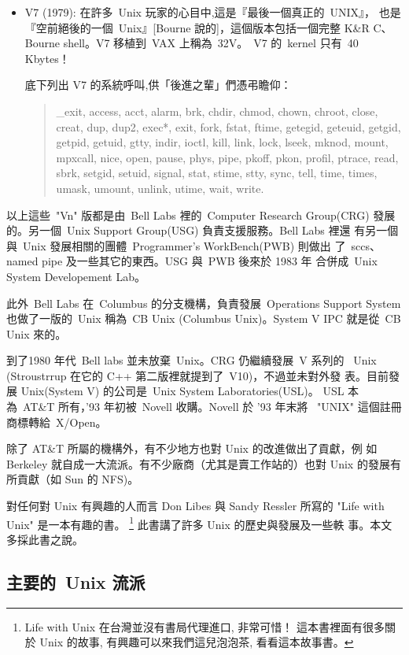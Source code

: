 \documentclass{article}
\begin{document}
\begin{CJK*}{Bg5}{ming}
{\begin{itemize}
    \item V7 (1979):  在許多~Unix 玩家的心目中,這是『最後一個真正的~UNIX』，
        也是『空前絕後的一個~Unix』[Bourne 說的]，這個版本包括一個完整
        K\&R C、Bourne shell。V7 移植到~VAX 上稱為~32V。~V7 的~kernel 
        只有~40 Kbytes！
    
    底下列出 V7 的系統呼叫,供「後進之輩」們憑弔瞻仰：
	\begin{quote}
        \_exit, access, acct, alarm, brk, chdir, chmod, chown,
        chroot, close, creat, dup, dup2, exec*, exit, fork, fstat,
        ftime, getegid, geteuid, getgid, getpid, getuid, gtty,
        indir, ioctl, kill, link, lock, lseek, mknod, mount,
        mpxcall, nice, open, pause, phys, pipe, pkoff, pkon,
        profil, ptrace, read, sbrk, setgid, setuid, signal, stat,
        stime, stty, sync, tell, time, times, umask, umount,
        unlink, utime, wait, write.
	\end{quote}
\end{itemize}
    以上這些~"Vn" 版都是由~Bell Labs 裡的~Computer Research Group(CRG) 
    發展的。另一個~Unix Support Group(USG) 負責支援服務。Bell Labs 裡還
    有另一個與~Unix 發展相關的團體~Programmer's WorkBench(PWB) 則做出
    了~sccs、named pipe 及一些其它的東西。USG 與~PWB 後來於 1983 年
    合併成~Unix System Developement Lab。

    此外~Bell Labs 在~Columbus 的分支機構，負責發展~Operations Support 
    System 也做了一版的~Unix 稱為~CB Unix (Columbus Unix)。System V IPC 
    就是從~CB Unix 來的。

    到了1980 年代~Bell labs 並未放棄~Unix。CRG 仍繼續發展~V 系列的
    ~Unix (Stroustrrup 在它的 C++ 第二版裡就提到了~V10)，不過並未對外發
    表。目前發展 Unix(System V) 的公司是~Unix System Laboratories(USL)。
    USL 本為~AT\&T 所有，'93 年初被~Novell 收購。Novell 於 '93 年末將
    ~"UNIX" 這個註冊商標轉給~X/Open。

    除了 AT\&T 所屬的機構外，有不少地方也對 Unix 的改進做出了貢獻，例
    如 Berkeley 就自成一大流派。有不少廠商（尤其是賣工作站的）也對 Unix 
    的發展有所貢獻（如 Sun 的 NFS)。
    
    對任何對 Unix 有興趣的人而言 Don Libes 與 Sandy Ressler 所寫的 "Life
    with Unix" 是一本有趣的書。
    \footnote{Life with Unix 在台灣並沒有書局代理進口, 非常可惜！
       這本書裡面有很多關於 Unix 的故事, 有興趣可以來我們這兒泡泡茶,
       看看這本故事書。} 此書講了許多 Unix 的歷史與發展及一些軼
    事。本文多採此書之說。

\subsection{主要的~Unix 流派}

}
\end{CJK*}
\end{document}
